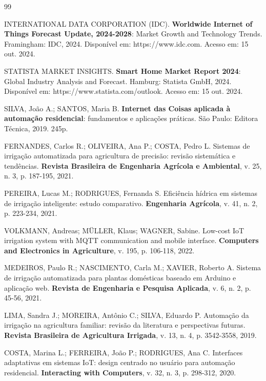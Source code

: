\documentclass[twoside,english,brazilian]{UNISINOSmonografia}
\begin{document}

\begin{thebibliography}{99}

INTERNATIONAL DATA CORPORATION (IDC). \textbf{Worldwide Internet of Things Forecast Update, 2024-2028}: Market Growth and Technology Trends. Framingham: IDC, 2024. Disponível em: https://www.idc.com. Acesso em: 15 out. 2024.

STATISTA MARKET INSIGHTS. \textbf{Smart Home Market Report 2024}: Global Industry Analysis and Forecast. Hamburg: Statista GmbH, 2024. Disponível em: https://www.statista.com/outlook. Acesso em: 15 out. 2024.

SILVA, João A.; SANTOS, Maria B. \textbf{Internet das Coisas aplicada à automação residencial}: fundamentos e aplicações práticas. São Paulo: Editora Técnica, 2019. 245p.

FERNANDES, Carlos R.; OLIVEIRA, Ana P.; COSTA, Pedro L. Sistemas de irrigação automatizada para agricultura de precisão: revisão sistemática e tendências. \textbf{Revista Brasileira de Engenharia Agrícola e Ambiental}, v. 25, n. 3, p. 187-195, 2021.

PEREIRA, Lucas M.; RODRIGUES, Fernanda S. Eficiência hídrica em sistemas de irrigação inteligente: estudo comparativo. \textbf{Engenharia Agrícola}, v. 41, n. 2, p. 223-234, 2021.

VOLKMANN, Andreas; MÜLLER, Klaus; WAGNER, Sabine. Low-cost IoT irrigation system with MQTT communication and mobile interface. \textbf{Computers and Electronics in Agriculture}, v. 195, p. 106-118, 2022.

MEDEIROS, Paulo R.; NASCIMENTO, Carla M.; XAVIER, Roberto A. Sistema de irrigação automatizada para plantas domésticas baseado em Arduino e aplicação web. \textbf{Revista de Engenharia e Pesquisa Aplicada}, v. 6, n. 2, p. 45-56, 2021.

LIMA, Sandra J.; MOREIRA, Antônio C.; SILVA, Eduardo P. Automação da irrigação na agricultura familiar: revisão da literatura e perspectivas futuras. \textbf{Revista Brasileira de Agricultura Irrigada}, v. 13, n. 4, p. 3542-3558, 2019.

COSTA, Marina L.; FERREIRA, João P.; RODRIGUES, Ana C. Interfaces adaptativas em sistemas IoT: design centrado no usuário para automação residencial. \textbf{Interacting with Computers}, v. 32, n. 3, p. 298-312, 2020.

\end{thebibliography}
\end{document}
